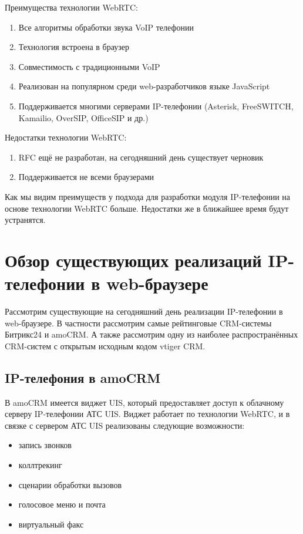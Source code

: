 Преимущества технологии WebRTC:
\begin{enumerate}
\item Все алгоритмы обработки звука VoIP телефонии
\item Технология встроена в браузер
\item Совместимость с традиционными VoIP
\item Реализован на популярном среди web-разработчиков языке JavaScript
\item Поддерживается многими серверами IP-телефонии (Asterisk, FreeSWITCH, Kamailio, OverSIP, OfficeSIP и др.)
\end{enumerate}

Недостатки технологии WebRTC:
\begin{enumerate}
\item RFC ещё не разработан, на сегодняшний день существует черновик\cite{WebRTC_W3C}
\item Поддерживается не всеми браузерами
\end{enumerate}

Как мы видим преимуществ у подхода для разработки модуля IP-телефонии на основе технологии WebRTC больше. Недостатки же в ближайшее время будут устранятся.

\section{Обзор существующих реализаций IP-телефонии в web-браузере}
\label{section:review}

Рассмотрим существующие на сегодняшний день реализации IP-телефонии в web-браузере. В частности рассмотрим самые рейтинговые CRM-системы Битрикс24 и amoCRM.\cite{bestCRMs} А также рассмотрим одну из наиболее распространённых CRM-систем с открытым исходным кодом vtiger CRM.

\subsection{IP-телефония в amoCRM}

В amoCRM имеется виджет UIS, который предоставляет доступ к облачному серверу IP-телефонии АТС UIS. Виджет работает по технологии WebRTC, и в связке с сервером АТС UIS реализованы следующие возможности\cite{amoCRM}:
\begin{itemize}
\item запись звонков
\item коллтрекинг
\item сценарии обработки вызовов
\item голосовое меню и почта
\item виртуальный факс
\end{itemize}

